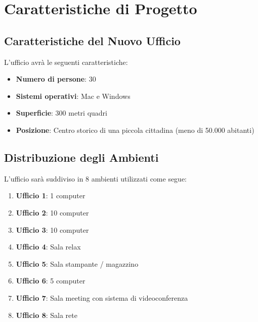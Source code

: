 \documentclass{assignment}
\begin{document}

\section{Caratteristiche di Progetto}

\begin{center}
\begin{exercisebox}
\subsection{Caratteristiche del Nuovo Ufficio}

L'ufficio avrà le seguenti caratteristiche:

\begin{itemize}
    \item \textbf{Numero di persone}: 30
    \item \textbf{Sistemi operativi}: Mac e Windows
    \item \textbf{Superficie}: 300 metri quadri
    \item \textbf{Posizione}: Centro storico di una piccola cittadina (meno di 50.000 abitanti)
\end{itemize}

\subsection{Distribuzione degli Ambienti}

L'ufficio sarà suddiviso in 8 ambienti utilizzati come segue:

\begin{enumerate}
    \item \textbf{Ufficio 1}: 1 computer
    \item \textbf{Ufficio 2}: 10 computer
    \item \textbf{Ufficio 3}: 10 computer
    \item \textbf{Ufficio 4}: Sala relax
    \item \textbf{Ufficio 5}: Sala stampante / magazzino
    \item \textbf{Ufficio 6}: 5 computer
    \item \textbf{Ufficio 7}: Sala meeting con sistema di videoconferenza
    \item \textbf{Ufficio 8}: Sala rete
\end{enumerate}
\end{exercisebox}
\end{center}
\end{document}
